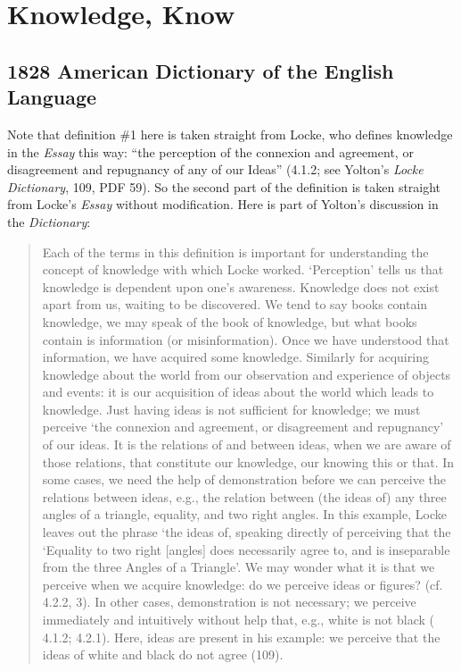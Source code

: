 \section{Knowledge, Know}
	\label{KNOWLEDGE}
	

\subsection{1828 American Dictionary of the English Language} %
	\label{KNOWLEDGE-1828}
	
	Note that definition \#1 here is taken straight from Locke, who defines knowledge in the \textit{Essay} this way: ``the perception of the connexion and agreement, or disagreement and repugnancy of any of our Ideas'' (4.1.2; see Yolton's \textit{Locke Dictionary}, 109, PDF 59). So the second part of the definition is taken straight from Locke's \textit{Essay} without modification. Here is part of Yolton's discussion in the \textit{Dictionary}:
	
		\begin{quote}
			Each of the terms in this definition is important for understanding the concept of knowledge with which Locke worked. `Perception' tells us that knowledge is dependent upon one's awareness. Knowledge does not exist apart from us, waiting to be discovered. We tend to say books contain knowledge, we may speak of the book of knowledge, but what books contain is information (or misinformation). Once we have understood that information, we have acquired some knowledge. Similarly for acquiring knowledge about the world from our observation and experience of objects and events: it is our acquisition of ideas about the world which leads to knowledge. Just having ideas is not sufficient for knowledge; we must perceive `the connexion and agreement, or disagreement and repugnancy' of our ideas. It is the relations of and between ideas, when we are aware of those relations, that constitute our knowledge, our knowing this or that. In some cases, we need the help of demonstration before we can perceive the relations between ideas, e.g., the relation between (the ideas of) any three angles of a triangle, equality, and two right angles. In this example, Locke leaves out the phrase `the ideas of, speaking directly of perceiving that the `Equality to two right [angles] does necessarily agree to, and is inseparable from the three Angles of a Triangle'. We may wonder what it is that we perceive when we acquire knowledge: do we perceive ideas or figures? (cf. 4.2.2, 3). In other cases, demonstration is not necessary; we perceive immediately and intuitively without help that, e.g., white is not black ( 4.1.2; 4.2.1). Here, ideas are present in his example: we perceive that the ideas of white and black do not agree (109).
		\end{quote}
		
